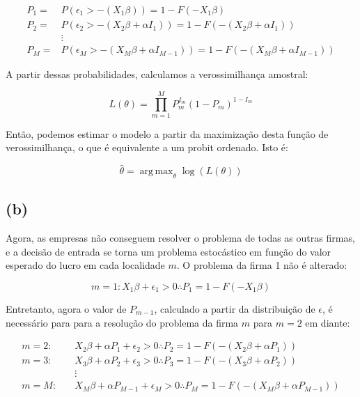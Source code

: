 \documentclass{article}
\DeclareMathOperator*{\argmax}{arg\,max}
\begin{document}
\begin{equation*}
\begin{aligned}
        P_1 = & P(\epsilon_1 > - (X_1\beta)) = 1 - F(-X_1\beta) \\
    P_2 = & P(\epsilon_2 > -(X_2\beta+ \alpha I_1)) = 1 - F(-(X_2\beta+ \alpha I_1)) \\
    & \vdots \\
    P_M = & P(\epsilon_M > -(X_M\beta+ \alpha I_{M-1})) = 1 - F(-(X_M\beta+ \alpha I_{M-1}))
\end{aligned}
\end{equation*}

A partir dessas probabilidades, calculamos a verossimilhança amostral:

\begin{equation*}
    L(\theta) = \prod_{m=1}^{M} P_m ^{I_m} (1 - P_m)^{1 - I_m}
\end{equation*}

Então, podemos estimar o modelo a partir da maximização desta função de verossimilhança, o que é equivalente a um probit ordenado. Isto é:

\begin{equation*}
    \hat{\theta} = \argmax_\theta \log(L(\theta))
\end{equation*}

\subsection*{(b)}

Agora, as empresas não conseguem resolver o problema de todas as outras firmas, e a decisão de entrada se torna um problema estocástico em função do valor esperado do lucro em cada localidade $m$. O problema da firma 1 não é alterado:

\begin{equation*}
    m = 1 : X_1 \beta + \epsilon_1 > 0 \therefore P_1 = 1 - F(-X_1 \beta)
\end{equation*}

Entretanto, agora o valor de $P_{m-1}$, calculado a partir da distribuição de $\epsilon$, é necessário para para a resolução do problema da firma $m$ para $m = 2$ em diante:

\begin{equation*}
\begin{aligned}
        m = 2 : \quad & X_2 \beta + \alpha P_1 + \epsilon_2 > 0 \therefore P_2 = 1 - F(-(X_2 \beta + \alpha P_1)) \\
        m = 3 : \quad & X_3 \beta + \alpha P_2 + \epsilon_3 > 0 \therefore P_3 = 1 - F(-(X_3 \beta + \alpha P_2)) \\
        & \vdots \\
        m = M : \quad & X_M \beta + \alpha P_{M-1} + \epsilon_M > 0 \therefore P_M = 1 - F(-(X_M \beta + \alpha P_{M-1}))
\end{aligned} 
\end{equation*}
\end{document}
